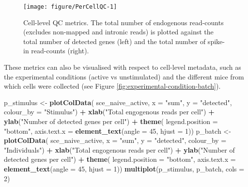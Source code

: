 \documentclass[9pt,a4paper,]{extarticle}
\newenvironment{Shaded}{\begin{snugshade}}{\end{snugshade}}
\newcommand{\DataTypeTok}[1]{\textcolor[rgb]{0.13,0.29,0.53}{#1}}
\newcommand{\DecValTok}[1]{\textcolor[rgb]{0.00,0.00,0.81}{#1}}
\newcommand{\KeywordTok}[1]{\textcolor[rgb]{0.13,0.29,0.53}{\textbf{#1}}}
\newcommand{\NormalTok}[1]{#1}
\newcommand{\OperatorTok}[1]{\textcolor[rgb]{0.81,0.36,0.00}{\textbf{#1}}}
\newcommand{\StringTok}[1]{\textcolor[rgb]{0.31,0.60,0.02}{#1}}
\begin{document}
\begin{figure}

{\centering \texttt{[image: figure/PerCellQC-1]} 

}

\caption{Cell-level QC metrics. The total number of endogenous read-counts (excludes non-mapped and intronic reads) is plotted against the total number of detected genes (left) and the total number of spike-in read-counts (right).}\label{fig:PerCellQC}
\end{figure}

These metrics can also be visualised with respect to cell-level metadata, such
as the experimental conditions (active vs unstimulated) and the different mice
from which cells were collected (see Figure \ref{fig:experimental-condition-batch}).

\begin{Shaded}
\begin{Highlighting}[]
\NormalTok{p_stimulus <-}\StringTok{ }\KeywordTok{plotColData}\NormalTok{(}
\NormalTok{    sce_naive_active,}
    \DataTypeTok{x =} \StringTok{"sum"}\NormalTok{,}
    \DataTypeTok{y =} \StringTok{"detected"}\NormalTok{, }
    \DataTypeTok{colour_by =} \StringTok{"Stimulus"}\NormalTok{) }\OperatorTok{+}
\StringTok{  }\KeywordTok{xlab}\NormalTok{(}\StringTok{"Total engogenous reads per cell"}\NormalTok{) }\OperatorTok{+}
\StringTok{  }\KeywordTok{ylab}\NormalTok{(}\StringTok{"Number of detected genes per cell"}\NormalTok{) }\OperatorTok{+}
\StringTok{  }\KeywordTok{theme}\NormalTok{(}
    \DataTypeTok{legend.position =} \StringTok{"bottom"}\NormalTok{,}
    \DataTypeTok{axis.text.x =} \KeywordTok{element_text}\NormalTok{(}\DataTypeTok{angle =} \DecValTok{45}\NormalTok{, }\DataTypeTok{hjust =} \DecValTok{1}\NormalTok{))}
\NormalTok{p_batch <-}\StringTok{ }\KeywordTok{plotColData}\NormalTok{(}
\NormalTok{    sce_naive_active,}
    \DataTypeTok{x =} \StringTok{"sum"}\NormalTok{,}
    \DataTypeTok{y =} \StringTok{"detected"}\NormalTok{, }
    \DataTypeTok{colour_by =} \StringTok{"Individuals"}\NormalTok{) }\OperatorTok{+}
\StringTok{  }\KeywordTok{xlab}\NormalTok{(}\StringTok{"Total engogenous reads per cell"}\NormalTok{) }\OperatorTok{+}
\StringTok{  }\KeywordTok{ylab}\NormalTok{(}\StringTok{"Number of detected genes per cell"}\NormalTok{) }\OperatorTok{+}
\StringTok{  }\KeywordTok{theme}\NormalTok{(}
    \DataTypeTok{legend.position =} \StringTok{"bottom"}\NormalTok{,}
    \DataTypeTok{axis.text.x =} \KeywordTok{element_text}\NormalTok{(}\DataTypeTok{angle =} \DecValTok{45}\NormalTok{, }\DataTypeTok{hjust =} \DecValTok{1}\NormalTok{))}
\KeywordTok{multiplot}\NormalTok{(p_stimulus, p_batch, }\DataTypeTok{cols =} \DecValTok{2}\NormalTok{)}
\end{Highlighting}
\end{Shaded}
\end{document}
